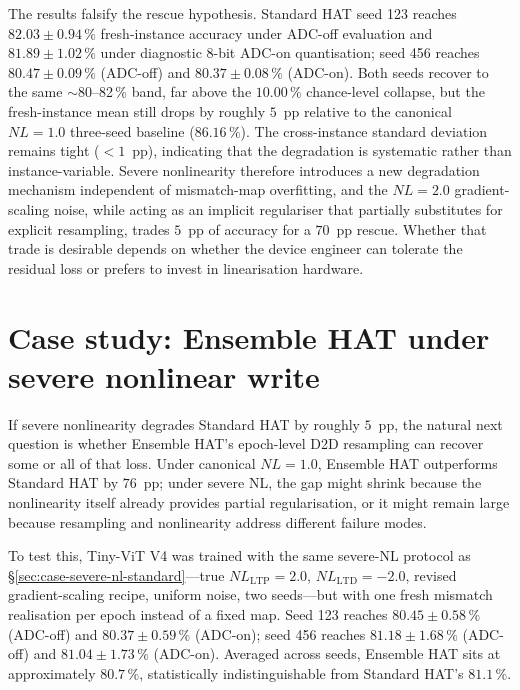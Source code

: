 The results falsify the rescue hypothesis.  Standard HAT seed 123 reaches $82.03\pm0.94\,\%$ fresh-instance accuracy under ADC-off evaluation and $81.89\pm1.02\,\%$ under diagnostic 8-bit ADC-on quantisation; seed 456 reaches $80.47\pm0.09\,\%$ (ADC-off) and $80.37\pm0.08\,\%$ (ADC-on).  Both seeds recover to the same $\sim$80--82\,\% band, far above the $10.00\,\%$ chance-level collapse, but the fresh-instance mean still drops by roughly $5$~pp relative to the canonical $NL=1.0$ three-seed baseline ($86.16\,\%$).  The cross-instance standard deviation remains tight ($<1$~pp), indicating that the degradation is systematic rather than instance-variable.  Severe nonlinearity therefore introduces a new degradation mechanism independent of mismatch-map overfitting, and the $NL=2.0$ gradient-scaling noise, while acting as an implicit regulariser that partially substitutes for explicit resampling, trades $5$~pp of accuracy for a $70$~pp rescue.  Whether that trade is desirable depends on whether the device engineer can tolerate the residual loss or prefers to invest in linearisation hardware.


\section{Case study: Ensemble HAT under severe nonlinear write}
\label{sec:case-severe-nl-ensemble}

If severe nonlinearity degrades Standard HAT by roughly $5$~pp, the natural next question is whether Ensemble HAT's epoch-level D2D resampling can recover some or all of that loss.  Under canonical $NL=1.0$, Ensemble HAT outperforms Standard HAT by $76$~pp; under severe NL, the gap might shrink because the nonlinearity itself already provides partial regularisation, or it might remain large because resampling and nonlinearity address different failure modes.

To test this, Tiny-ViT V4 was trained with the same severe-NL protocol as \S\ref{sec:case-severe-nl-standard}---true $NL_{\mathrm{LTP}}=2.0$, $NL_{\mathrm{LTD}}=-2.0$, revised gradient-scaling recipe, uniform noise, two seeds---but with one fresh mismatch realisation per epoch instead of a fixed map.  Seed 123 reaches $80.45\pm0.58\,\%$ (ADC-off) and $80.37\pm0.59\,\%$ (ADC-on); seed 456 reaches $81.18\pm1.68\,\%$ (ADC-off) and $81.04\pm1.73\,\%$ (ADC-on).  Averaged across seeds, Ensemble HAT sits at approximately $80.7\,\%$, statistically indistinguishable from Standard HAT's $81.1\,\%$.


